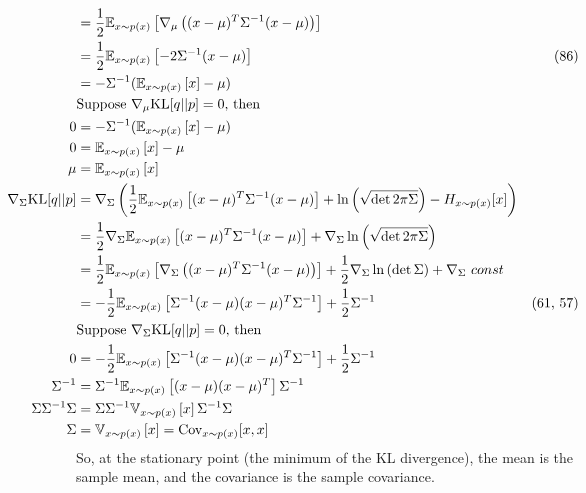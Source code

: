 \documentclass[11pt]{article} %
\begin{document}
\begin{enumerate}
\begin{align*}
 	&=  \frac{1}{2}\mathbb{E}_{x\sim p(x)}\left[\nabla_\mu\left((x-\mu)^T\Sigma^{-1}(x-\mu)\right)\right] \\
 	&=  \frac{1}{2}\mathbb{E}_{x\sim p(x)}\left[-2\Sigma^{-1}(x-\mu)\right]  &\textrm{(86)}\\
 	&=  -\Sigma^{-1}(\mathbb{E}_{x\sim p(x)}\left[x\right]-\mu)\\
 	&\textrm{Suppose } \nabla_\mu\textrm{KL}[q||p] = 0 \textrm{, then}\\
 	\hspace{-2cm}0 &= -\Sigma^{-1}(\mathbb{E}_{x\sim p(x)}\left[x\right]-\mu)\\
 	\hspace{-2cm}0 &= \mathbb{E}_{x\sim p(x)}\left[x\right]-\mu\\
 	\hspace{-2cm}\mu&= \mathbb{E}_{x\sim p(x)}\left[x\right] \\
 	\hspace{-2cm}\nabla_\Sigma\textrm{KL}[q||p]
 	&= \nabla_\Sigma \left(\frac{1}{2}\mathbb{E}_{x\sim p(x)}\left[(x-\mu)^T\Sigma^{-1}(x-\mu)\right]+ \ln\left(\sqrt{\det 2\pi\Sigma}\right) - H_{x\sim p(x)} [x]\right) \\
 	&=  \frac{1}{2}\nabla_\Sigma\mathbb{E}_{x\sim p(x)}\left[(x-\mu)^T\Sigma^{-1}(x-\mu)\right]+ \nabla_\Sigma\ln\left(\sqrt{\det 2\pi\Sigma}\right) \\
 	&=  \frac{1}{2}\mathbb{E}_{x\sim p(x)}\left[\nabla_\Sigma\left((x-\mu)^T\Sigma^{-1}(x-\mu)\right)\right]+ \frac{1}{2}\nabla_\Sigma\ln\left(\det \Sigma\right) + \nabla_\Sigma ~const \\
 	&=  -\frac{1}{2}\mathbb{E}_{x\sim p(x)}\left[\Sigma^{-1}(x-\mu)(x-\mu)^T\Sigma^{-1}\right]+ \frac{1}{2}\Sigma^{-1} & \textrm{(61, 57)}\\
 	&\textrm{Suppose } \nabla_\Sigma\textrm{KL}[q||p] = 0 \textrm{, then}\\
 	\hspace{-2cm}0 &= -\frac{1}{2}\mathbb{E}_{x\sim p(x)}\left[\Sigma^{-1}(x-\mu)(x-\mu)^T\Sigma^{-1}\right]+ \frac{1}{2}\Sigma^{-1} \\
 	\hspace{-2cm}\Sigma^{-1} &= \Sigma^{-1}\mathbb{E}_{x\sim p(x)}\left[(x-\mu)(x-\mu)^T\right]\Sigma^{-1} \\
 	\hspace{-2cm}\Sigma\Sigma^{-1}\Sigma &= \Sigma\Sigma^{-1}\mathbb{V}_{x\sim p(x)}\left[x\right]\Sigma^{-1}\Sigma \\
 	\hspace{-2cm}\Sigma &= \mathbb{V}_{x\sim p(x)}\left[x\right] = \textrm{Cov}_{x\sim p(x)}[x, x] \\
 \end{align*}
So, at the stationary point (the minimum of the KL divergence), the mean is the sample mean, and the covariance is the sample covariance.


\end{enumerate}
\end{document}
